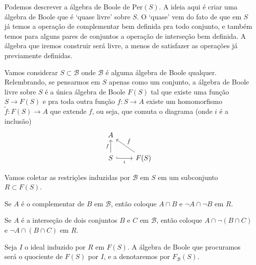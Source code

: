 \documentclass[11pt]{article}
\theoremstyle{definition}
\theoremstyle{definition}
\theoremstyle{definition}
\theoremstyle{definition}
\theoremstyle{definition}
\theoremstyle{definition}
\theoremstyle{definition}
\theoremstyle{definition}
\theoremstyle{definition}
\theoremstyle{definition}
\theoremstyle{definition}
\theoremstyle{definition}
\theoremstyle{definition}
\theoremstyle{definition}
\begin{document}
Podemos descrever a álgebra de Boole de $\text{Per}(S)$. A ideia aqui é criar uma álgebra de Boole que é `quase livre' sobre $S$. O `quase' vem do fato de que em $S$ já temos a operação de complementar bem definida pra todo conjunto, e também temos para alguns pares de conjuntos a operação de interseção bem definida. A álgebra que iremos construir será livre, a menos de satisfazer as operações já previamente definidas.

Vamos considerar $S \subset \mathcal{B}$ onde $\mathcal{B}$ é alguma álgebra de Boole qualquer. Relembrando, se pensarmos em $S$ apenas como um conjunto, a álgebra de Boole livre sobre $S$ é a única álgebra de Boole $F(S)$ tal que existe uma função $S \rightarrow F(S)$ e pra toda outra função $f: S \rightarrow A$ existe um homomorfismo $\tilde{f}: F(S) \rightarrow A$ que extende $f$, ou seja, que comuta o diagrama (onde $i$ é a inclusão)
\[\begin{tikzcd}
	A & \\
	S & {F(S)}
	\arrow["f", from=2-1, to=1-1]
	\arrow["i"', hook, from=2-1, to=2-2]
	\arrow["{\tilde{f}}"', from=2-2, to=1-1]
\end{tikzcd}\]

Vamos coletar as restrições induzidas por $\mathcal{B}$ em $S$ em um subconjunto $R \subset F(S)$. 

Se $A$ é o complementar de $B$ em $\mathcal{B}$, então coloque $A \cap B$ e $\lnot A \cap \lnot B$ em $R$.

Se $A$ é a interseção de dois conjuntos $B$ e $C$ em $\mathcal{B}$, então coloque $A \cap \lnot(B \cap C)$ e $\lnot A \cap (B \cap C)$ em $R$.

Seja $I$ o ideal induzido por $R$ em $F(S)$. A álgebra de Boole que procuramos será o quociente de $F(S)$ por $I$, e a denotaremos por $F_{\mathcal{B}}(S)$.
\end{document}
